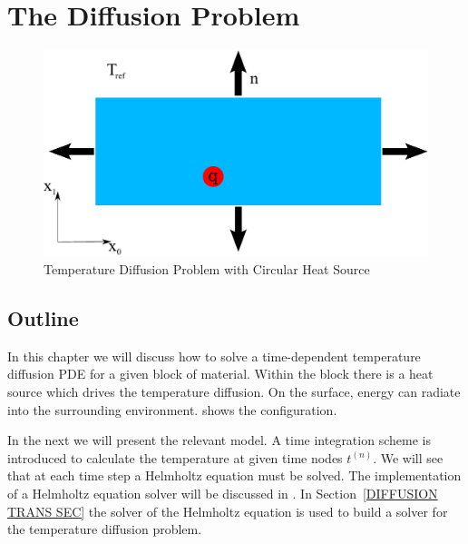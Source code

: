 
%
%
%


\section{The Diffusion Problem}
\label{DIFFUSION CHAP}

\begin{figure}
\centerline{\includegraphics[width=\figwidth]{figures/DiffusionDomain}}
\caption{Temperature Diffusion Problem with Circular Heat Source}
\label{DIFFUSION FIG 1}
\end{figure}

\subsection{\label{DIFFUSION OUT SEC}Outline}
In this chapter we will discuss how to solve a time-dependent temperature diffusion PDE for
a given block of material. Within the block there is a heat source which drives the temperature diffusion.
On the surface, energy can radiate into the surrounding environment.
 shows the configuration.

In the next  we will present the relevant model. A 
time integration scheme is introduced to calculate the temperature at given time nodes $t^{(n)}$. 
We will see that at each time step a Helmholtz equation  
must be solved. 
The implementation of a Helmholtz equation solver will be discussed in . 
In Section~\ref{DIFFUSION TRANS SEC} the solver of the Helmholtz equation is used to build a
solver for the temperature diffusion problem. 

